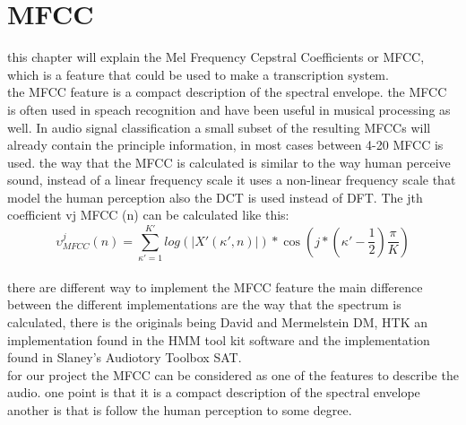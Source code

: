 \section{MFCC}
this chapter will explain the Mel Frequency Cepstral Coefficients or MFCC, which is a feature that could be used to make a transcription system. \\
the MFCC feature is a compact description of the spectral envelope. the MFCC is often used in speach recognition and have been useful in musical processing as well. In audio signal classification a small subset of the resulting MFCCs will already contain the principle information, in most cases between 4-20 MFCC is used. the way that the MFCC is calculated is  similar to the way human perceive sound, instead of a linear frequency scale it uses a non-linear frequency scale that model the human perception also the DCT is used instead of DFT. The jth coefficient 
vj  MFCC (n) can be calculated like this:\\
\begin{equation}\label{ eq:MFCC calculation}
	 \upsilon ^j  _{MFCC} (n) = \sum_{\kappa'=1}^{K'} log(\vert X' (\kappa',n) \vert)*\cos(j*(\kappa' - \frac{1}{2})\frac{\pi}{K})
\end{equation}
\\
there are different way to implement the MFCC feature the main difference between the different implementations are the way that the spectrum is calculated, there is the originals being David and Mermelstein DM, HTK an implementation found in the HMM tool kit software and the implementation found in Slaney's Audiotory Toolbox SAT.
\\
for our project the MFCC can be considered as one of the features to describe the audio. one point is that it is a compact description of the spectral envelope another is that is follow the human perception to some degree.